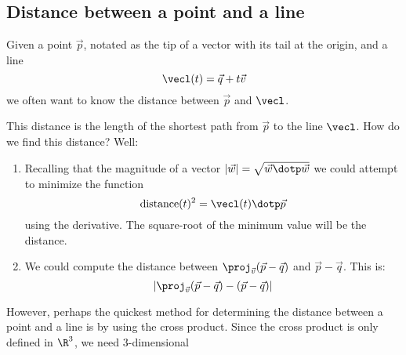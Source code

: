 \documentclass{ximera}
\begin{document}
\subsection{Distance between a point and a line}

Given a point $\vec{p}$, notated as the tip of a vector with its tail
at the origin, and a line
\[
\vecl(t) = \vec{q} + t\vec{v}
\]
we often want to know the distance between $\vec{p}$ and $\vecl$.
\begin{image}
\end{image}
This distance is the length of the shortest path from $\vec{p}$ to the
line $\vecl$. How do we find this distance? Well:
\begin{enumerate}
  \item Recalling that the magnitude of a vector $|\vec{w}|
    =\sqrt{\vec{w}\dotp\vec{w}}$ we could attempt to minimize the
    function
    \[
    \mathrm{distance}(t)^2= \vecl(t) \dotp \vec{p}
    \]
    using the derivative. The square-root of the minimum value will be
    the distance.
  \item We could compute the distance between
    $\proj_{\vec{v}}(\vec{p}-\vec{q})$ and $\vec{p}-\vec{q}$. This is:
    \[
    |\proj_{\vec{v}}(\vec{p}-\vec{q})- (\vec{p}-\vec{q})|
    \]
\end{enumerate}
However, perhaps the quickest method for determining the distance
between a point and a line is by using the cross product. Since the
cross product is only defined in $\R^3$, we need $3$-dimensional
\end{document}
